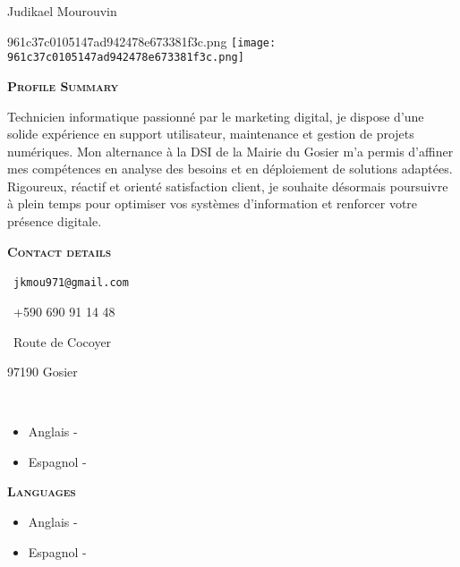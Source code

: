 \documentclass[11pt,a4paper]{article}
\newcommand{\headleft}[1]{\vspace*{3ex}\textsc{\textbf{#1}}\par%
  \vspace*{-1.5ex}\hrulefill\par\vspace*{0.7ex}}
\begin{document}
\thispagestyle{empty}
\setlength{\topskip}{0pt}\setlength{\parindent}{0pt}\setlength{\parskip}{0pt}
\raggedbottom

\begin{minipage}[t]{0.33\textwidth}
  \colorbox{cvblue}{\begin{minipage}[t][5mm][t]{\textwidth}\null\end{minipage}}
  \vspace{-.2ex}
  \colorbox{cvblue!90}{%
    \color{white}\textwidth
    \begin{minipage}[t][293mm][t]{0.82\textwidth}\raggedright
      \vspace*{2.5ex}
      \Large Judikael Mourouvin\normalsize

      \ifx\relax961c37c0105147ad942478e673381f3c.png\relax\else
        \vspace{2ex}\null\hfill
        \texttt{[image: 961c37c0105147ad942478e673381f3c.png]}
        \hfill\null
      \fi

      \headleft{Profile Summary}
      Technicien informatique passionné par le marketing digital, je dispose d’une solide expérience en support utilisateur, maintenance et gestion de projets numériques. Mon alternance à la DSI de la Mairie du Gosier m’a permis d’affiner mes compétences en analyse des besoins et en déploiement de solutions adaptées. Rigoureux, réactif et orienté satisfaction client, je souhaite désormais poursuivre à plein temps pour optimiser vos systèmes d’information et renforcer votre présence digitale.

      \headleft{Contact details}\small
      \MVAt\  \texttt{jkmou971@gmail.com}\par
      \Mobilefone\ +590 690 91 14 48\par
      \Letter\ Route de Cocoyer\par
      97190 Gosier\par
      \faLinkedin\  \href{}{}
      \normalsize

      \ifx\relax\begin{itemize}[leftmargin=*]
\item Anglais - \textcolor{gray}{}
\item Espagnol - \textcolor{gray}{}\end{itemize}\relax\else
        \headleft{Languages}
        \begin{itemize}[leftmargin=*]
\item Anglais - \textcolor{gray}{}
\item Espagnol - \textcolor{gray}{}\end{itemize}
      \fi


\end{minipage}}
\end{minipage}
\end{document}
